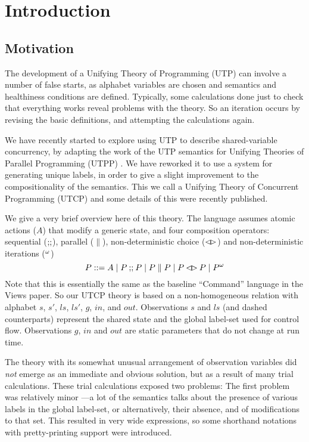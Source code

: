 \section{Introduction}\label{sec:Intro}

\subsection{Motivation}

The development of a Unifying Theory of Programming (UTP)
can involve a number of false starts,
as alphabet variables are chosen
and semantics and healthiness conditions are defined.
Typically, some calculations done just to check that everything
works reveal problems with the theory.
So an iteration occurs by revising the basic definitions,
and attempting the calculations again.

We have recently started to explore using UTP
to describe shared-variable concurrency,
by adapting the work of the  UTP semantics for Unifying Theories
of Parallel Programming (UTPP) \cite{DBLP:conf/icfem/WoodcockH02}.
We have reworked it to use a system for generating unique labels,
in order to give a slight improvement to the compositionality
of the semantics. This we call a Unifying Theory of Concurrent Programming
(UTCP) and some details of this were recently published\cite{conf/tase/BMN16}.

We give a very brief overview here of this theory.
The language assumes atomic actions ($A$) that modify a generic state,
and four composition operators: sequential ($\mathrel{\mathbf{;\!;}}$), parallel ($\parallel$),
non-deterministic choice ($\mathbin{\lhd\!\rhd}$) and non-deterministic iterations (${}^{\omega}$)
\[
   P ::= A \mid P \mathbin{\mathbf{;\!;}} P \mid P \parallel P \mid P \mathbin{\lhd\!\rhd} P \mid {P}^{\omega}
\]
Note that this is essentially the same as the baseline ``Command'' language
in the Views paper\cite{conf/popl/Dinsdale-YoungBGPY13}.
So our UTCP theory is based on a non-homogeneous relation
with alphabet $s$, $s'$, $ls$, $ls'$, $g$, $in$, and $out$.
Observations $s$ and $ls$ (and dashed counterparts)
represent the shared state and the global label-set used for control flow.
Observations $g$, $in$ and $out$ are static parameters that do not change
at run time.


The theory with its somewhat unusual arrangement of observation variables
did \emph{not} emerge as an immediate and obvious solution,
but as a result of many trial calculations.
These trial calculations exposed two problems:
The first problem was relatively minor
---a lot of the semantics talks about the presence of various
labels in the global label-set, or alternatively, their  absence,
and of modifications to that set.
This resulted in very wide expressions,
so some shorthand notations with pretty-printing support were introduced.

